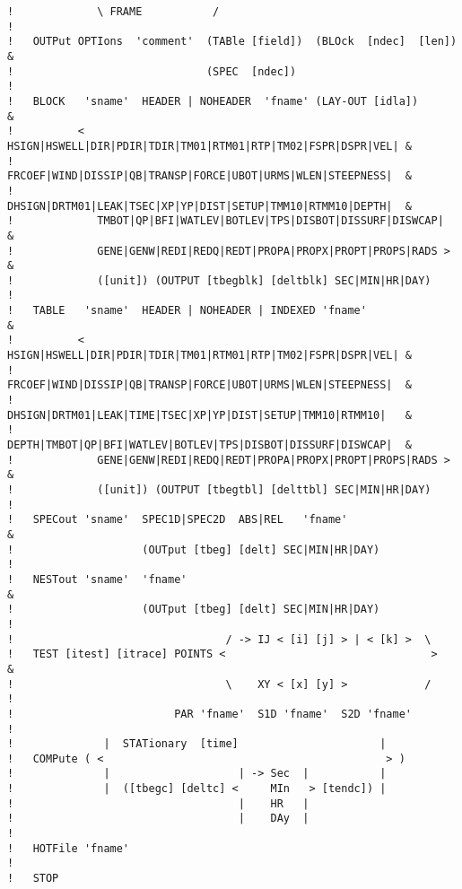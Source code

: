 \documentclass[12pt]{book}
\begin{document}
\begin{verbatim}
!             \ FRAME           /
!
!   OUTPut OPTIons  'comment'  (TABle [field])  (BLOck  [ndec]  [len])      &
!                              (SPEC  [ndec])
!
!   BLOCK   'sname'  HEADER | NOHEADER  'fname' (LAY-OUT [idla])            &
!          <  HSIGN|HSWELL|DIR|PDIR|TDIR|TM01|RTM01|RTP|TM02|FSPR|DSPR|VEL| &
!             FRCOEF|WIND|DISSIP|QB|TRANSP|FORCE|UBOT|URMS|WLEN|STEEPNESS|  &
!             DHSIGN|DRTM01|LEAK|TSEC|XP|YP|DIST|SETUP|TMM10|RTMM10|DEPTH|  &
!             TMBOT|QP|BFI|WATLEV|BOTLEV|TPS|DISBOT|DISSURF|DISWCAP|        &
!             GENE|GENW|REDI|REDQ|REDT|PROPA|PROPX|PROPT|PROPS|RADS >       &
!             ([unit]) (OUTPUT [tbegblk] [deltblk] SEC|MIN|HR|DAY)
!
!   TABLE   'sname'  HEADER | NOHEADER | INDEXED 'fname'                    &
!          <  HSIGN|HSWELL|DIR|PDIR|TDIR|TM01|RTM01|RTP|TM02|FSPR|DSPR|VEL| &
!             FRCOEF|WIND|DISSIP|QB|TRANSP|FORCE|UBOT|URMS|WLEN|STEEPNESS|  &
!             DHSIGN|DRTM01|LEAK|TIME|TSEC|XP|YP|DIST|SETUP|TMM10|RTMM10|   &
!             DEPTH|TMBOT|QP|BFI|WATLEV|BOTLEV|TPS|DISBOT|DISSURF|DISWCAP|  &
!             GENE|GENW|REDI|REDQ|REDT|PROPA|PROPX|PROPT|PROPS|RADS >       &
!             ([unit]) (OUTPUT [tbegtbl] [delttbl] SEC|MIN|HR|DAY)
!
!   SPECout 'sname'  SPEC1D|SPEC2D  ABS|REL   'fname'                       &
!                    (OUTput [tbeg] [delt] SEC|MIN|HR|DAY)
!
!   NESTout 'sname'  'fname'                                                &
!                    (OUTput [tbeg] [delt] SEC|MIN|HR|DAY)
!
!                                 / -> IJ < [i] [j] > | < [k] >  \
!   TEST [itest] [itrace] POINTS <                                >         &
!                                 \    XY < [x] [y] >            /
!
!                         PAR 'fname'  S1D 'fname'  S2D 'fname'
!
!              |  STATionary  [time]                      |
!   COMPute ( <                                            > )
!              |                    | -> Sec  |           |
!              |  ([tbegc] [deltc] <     MIn   > [tendc]) |
!                                   |    HR   |
!                                   |    DAy  |
!
!   HOTFile 'fname'
!
!   STOP
\end{verbatim}

 \label{app:spcform}
\end{document}
